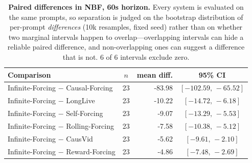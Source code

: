 \begin{table}[tb]
\centering
\small
\setlength{\tabcolsep}{6pt}
\begin{tabular}{l c r c}
\toprule
Comparison & $n$ & mean diff. & 95\% CI \\
\midrule
Infinite-Forcing $-$ Causal-Forcing & 23 & -83.98 & $[-102.59,\,-65.52]$ \\
Infinite-Forcing $-$ LongLive & 23 & -10.22 & $[-14.72,\,-6.18]$ \\
Infinite-Forcing $-$ Self-Forcing & 23 & -9.07 & $[-13.29,\,-5.53]$ \\
Infinite-Forcing $-$ Rolling-Forcing & 23 & -7.58 & $[-10.38,\,-5.12]$ \\
Infinite-Forcing $-$ CausVid & 23 & -5.62 & $[-9.61,\,-2.10]$ \\
Infinite-Forcing $-$ Reward-Forcing & 23 & -4.86 & $[-7.48,\,-2.69]$ \\
\bottomrule
\end{tabular}
\caption{\textbf{Paired differences in NBF, 60s horizon.} Every system is evaluated on the same prompts, so separation is judged on the bootstrap distribution of per-prompt \emph{differences} (10k resamples, fixed seed) rather than on whether two marginal intervals happen to overlap---overlapping intervals can hide a reliable paired difference, and non-overlapping ones can suggest a difference that is not. 6 of 6 intervals exclude zero.}
\label{tab:paired}
\end{table}